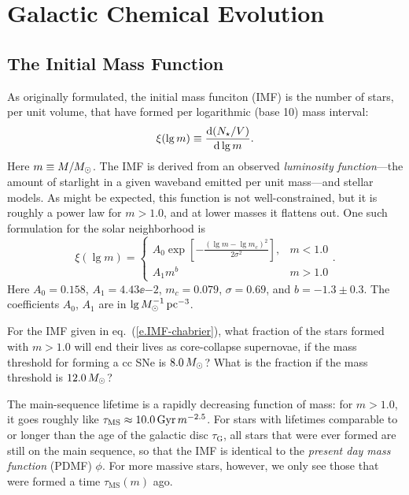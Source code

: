 \chapter{Galactic Chemical Evolution}
\newcommand{\tms}{\ensuremath{\tau_{\mathrm{MS}}}}
\newcommand{\tauG}{\ensuremath{\tau_{\mathrm{G}}}}
\newcommand{\AIa}{\ensuremath{A_{\mathrm{Ia}}}}


\section{The Initial Mass Function}\label{s.IMF}

As originally formulated\cite{Salpeter1955The-Luminosity-}, the initial mass funciton (IMF) is the number of stars, per unit volume, that have formed per logarithmic (base 10) mass interval:
\begin{equation}\label{e.IMF}
\xi(\lg m) \equiv \frac{\mathrm{d}(N_{\star}/V)}{\mathrm{d}\lg m}.
\end{equation}
Here $m \equiv M/M_\odot$.
The IMF is derived from an observed \emph{luminosity function}---the amount of starlight in a given waveband emitted per unit mass---and stellar models.  As might be expected, this function is not well-constrained, but it is roughly a power law for $m > 1.0$, and at lower masses it flattens out. One such formulation\cite{Chabrier2003Galactic-Stella} for the solar neighborhood is
\begin{equation}\label{e.IMF-chabrier}
\xi(\lg m) = \left\{\begin{array}{lr}A_0\exp\left[-\frac{(\lg m - \lg m_c)^2}{2\sigma^2}\right], & m < 1.0 \\A_1 m^b & m > 1.0\end{array}\right. .
\end{equation}
Here $A_{0} = 0.158$, $A_{1} = 4.43\ee{-2}$, $m_{c} = 0.079$, $\sigma = 0.69$, and $b = -1.3\pm 0.3$.  The coefficients $A_{0}$, $A_{1}$ are in $\lg M_\odot^{-1}\,\mathrm{pc}^{-3}$.

\begin{exercisebox}
 For the IMF given in eq.~(\ref{e.IMF-chabrier}), what fraction of the stars formed with $m > 1.0$ will end their lives as core-collapse supernovae, if the mass threshold for forming a cc SNe is $8.0\,M_\odot$?  What is the fraction if the mass threshold is $12.0\,M_\odot$?
\end{exercisebox}

The main-sequence lifetime is a rapidly decreasing function of mass: for $m > 1.0$, it goes roughly like $\tms \approx 10.0\nsp\Giga\yr\nsp m^{-2.5}$. For stars with lifetimes comparable to or longer than the age of the galactic disc $\tauG$, all stars that were ever formed are still on the main sequence, so that the IMF is identical to  the \emph{present day mass function} (PDMF) $\phi$.  For more massive stars, however, we only see those that were formed a time $\tms(m)$ ago.

